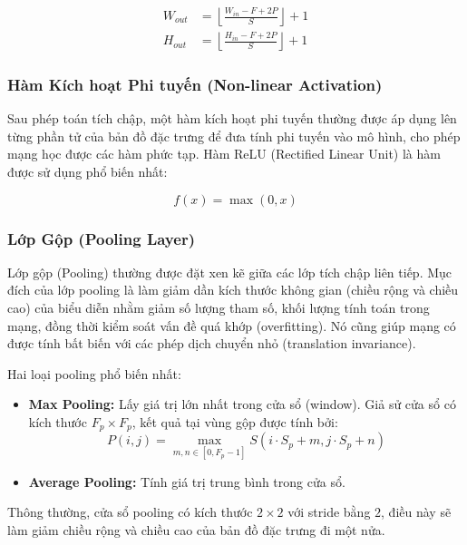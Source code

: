 \documentclass[12pt,a4paper]{article}
\begin{document}
\begin{align}
    W_{out} &= \left\lfloor \frac{W_{in} - F + 2P}{S} \right\rfloor + 1 \\
    H_{out} &= \left\lfloor \frac{H_{in} - F + 2P}{S} \right\rfloor + 1
\end{align}

\subsubsection{Hàm Kích hoạt Phi tuyến (Non-linear Activation)}

Sau phép toán tích chập, một hàm kích hoạt phi tuyến thường được áp dụng lên từng phần tử của bản đồ đặc trưng để đưa tính phi tuyến vào mô hình, cho phép mạng học được các hàm phức tạp. Hàm ReLU (Rectified Linear Unit) là hàm được sử dụng phổ biến nhất:

\begin{equation}
    f(x) = \max(0, x)
\end{equation}

\subsubsection{Lớp Gộp (Pooling Layer)}

Lớp gộp (Pooling) thường được đặt xen kẽ giữa các lớp tích chập liên tiếp. Mục đích của lớp pooling là làm giảm dần kích thước không gian (chiều rộng và chiều cao) của biểu diễn nhằm giảm số lượng tham số, khối lượng tính toán trong mạng, đồng thời kiểm soát vấn đề quá khớp (overfitting). Nó cũng giúp mạng có được tính bất biến với các phép dịch chuyển nhỏ (translation invariance).

Hai loại pooling phổ biến nhất:
\begin{itemize}
    \item \textbf{Max Pooling:} Lấy giá trị lớn nhất trong cửa sổ (window). Giả sử cửa sổ có kích thước $F_p \times F_p$, kết quả tại vùng gộp được tính bởi:
    \begin{equation}
        P(i, j) = \max_{m, n \in [0, F_p-1]} S(i \cdot S_p + m, j \cdot S_p + n)
    \end{equation}
    \item \textbf{Average Pooling:} Tính giá trị trung bình trong cửa sổ.
\end{itemize}

Thông thường, cửa sổ pooling có kích thước $2 \times 2$ với stride bằng $2$, điều này sẽ làm giảm chiều rộng và chiều cao của bản đồ đặc trưng đi một nửa.
\end{document}
